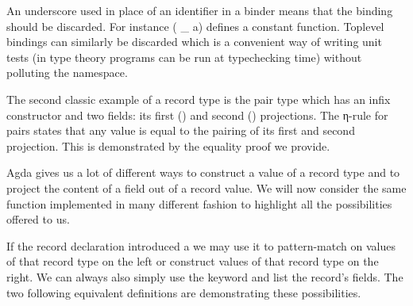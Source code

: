 \begin{feature}
An underscore used in place of an identifier in a binder means that the binding
should be discarded. For instance {( \_  a)} defines a constant function.
Toplevel bindings can similarly be discarded which is a convenient way of
writing unit tests (in type theory programs can be run at typechecking time)
without polluting the namespace.
\end{feature}

The second classic example of a record type is the pair type  which
has an infix constructor \AIC{\_,\_} and two fields: its first () and
second () projections. The η-rule for pairs states that any value is
equal to the pairing of its first and second projection. This is demonstrated
by the equality proof we provide.


\begin{minipage}[t]{0.5\textwidth}
\end{minipage}
\begin{minipage}[t]{0.5\textwidth}
\end{minipage}


Agda gives us a lot of different ways to construct a value of a record type
and to project the content of a field out of a record value. We will now
consider the same function  implemented in many different fashion
to highlight all the possibilities offered to us.

If the record declaration introduced a  we may use it to
pattern-match on values of that record type on the left or construct
values of that record type on the right. We can always also simply use
the  keyword and list the record's fields. The two following
equivalent definitions are demonstrating these possibilities.

\begin{minipage}[t]{0.5\textwidth}
\end{minipage}\begin{minipage}[t]{0.5\textwidth}
\end{minipage}

